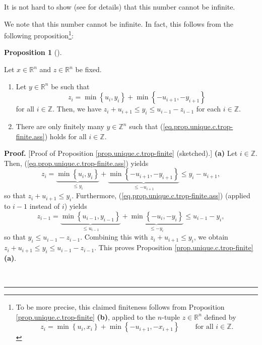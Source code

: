 \documentclass[numbers=enddot,12pt,final,onecolumn,notitlepage]{scrartcl}%
\theoremstyle{definition}
\newtheorem{prop}[theo]{Proposition}
\newenvironment{proposition}[1][]
{\begin{prop}[#1]\begin{leftbar}}
{\end{leftbar}\end{prop}}
\newenvironment{proof}[1][Proof]{\noindent\textbf{#1.} }{\ \rule{0.5em}{0.5em}}
\newenvironment{verlong}{}{}
\newenvironment{vershort}{}{}
\begin{document}
\begin{vershort}
It is not hard to show (see \cite{verlong} for details) that this number
cannot be infinite.
\end{vershort}

\begin{verlong}
We note that this number cannot be infinite. In fact, this follows from the
following proposition\footnote{To be more precise, this claimed finiteness
follows from Proposition \ref{prop.unique.c.trop-finite} \textbf{(b)}, applied
to the $n$-tuple $z\in\mathbb{R}^{n}$ defined by%
\[
z_{i}=\min\left\{  u_{i},x_{i}\right\}  +\min\left\{  -u_{i+1},-x_{i+1}%
\right\}  \ \ \ \ \ \ \ \ \ \ \text{for all }i\in\mathbb{Z}.
\]
}:

\begin{proposition}
\label{prop.unique.c.trop-finite}Let $x\in\mathbb{R}^{n}$ and $z\in
\mathbb{R}^{n}$ be fixed. 

\begin{enumerate}
\item[\textbf{(a)}] Let $y\in\mathbb{R}^{n}$ be such that%
\begin{equation}
z_{i}=\min\left\{  u_{i},y_{i}\right\}  +\min\left\{  -u_{i+1},-y_{i+1}%
\right\}  \label{eq.prop.unique.c.trop-finite.ass}%
\end{equation}
for all $i\in\mathbb{Z}$. Then, we have $z_{i}+u_{i+1}\leq y_{i}\leq
u_{i-1}-z_{i-1}$ for each $i\in\mathbb{Z}$.

\item[\textbf{(b)}] There are only finitely many $y\in\mathbb{Z}^{n}$ such
that (\ref{eq.prop.unique.c.trop-finite.ass}) holds for all $i\in\mathbb{Z}$.
\end{enumerate}
\end{proposition}

\begin{proof}
[Proof of Proposition \ref{prop.unique.c.trop-finite} (sketched).]
\textbf{(a)} Let $i\in\mathbb{Z}$. Then,
(\ref{eq.prop.unique.c.trop-finite.ass}) yields%
\[
z_{i}=\underbrace{\min\left\{  u_{i},y_{i}\right\}  }_{\leq y_{i}%
}+\underbrace{\min\left\{  -u_{i+1},-y_{i+1}\right\}  }_{\leq-u_{i+1}}\leq
y_{i}-u_{i+1},
\]
so that $z_{i}+u_{i+1}\leq y_{i}$. Furthermore,
(\ref{eq.prop.unique.c.trop-finite.ass}) (applied to $i-1$ instead of $i$)
yields%
\[
z_{i-1}=\underbrace{\min\left\{  u_{i-1},y_{i-1}\right\}  }_{\leq u_{i-1}%
}+\underbrace{\min\left\{  -u_{i},-y_{i}\right\}  }_{\leq-y_{i}}\leq
u_{i-1}-y_{i},
\]
so that $y_{i}\leq u_{i-1}-z_{i-1}$. Combining this with $z_{i}+u_{i+1}\leq
y_{i}$, we obtain $z_{i}+u_{i+1}\leq y_{i}\leq u_{i-1}-z_{i-1}$. This proves
Proposition \ref{prop.unique.c.trop-finite} \textbf{(a)}.


\end{proof}
\end{verlong}
\end{document}
